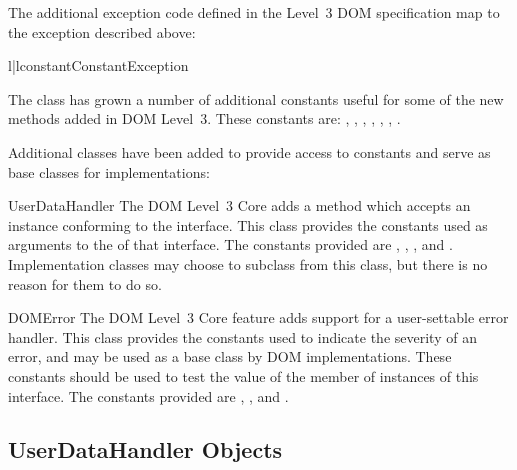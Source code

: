 \documentclass{howto}
\begin{document}
The additional exception code defined in the Level~3 DOM specification
map to the exception described above:

\begin{tableii}{l|l}{constant}{Constant}{Exception}
\end{tableii}

The  class has grown a number of additional constants
useful for some of the new methods added in DOM Level~3.  These
constants are:  ,
, ,
,
,
,
.

Additional classes have been added to provide access to constants and
serve as base classes for implementations:

\begin{classdesc*}{UserDataHandler}
  The DOM Level~3 Core adds a method
   which accepts an instance conforming to the
   interface.  This class provides the
  constants used as arguments to the  of that
  interface.  The constants provided are ,
  , , and
  .  Implementation classes may choose to
  subclass from this class, but there is no reason for them to do so.
\end{classdesc*}

\begin{classdesc*}{DOMError}
  The DOM Level~3 Core feature adds support for a user-settable
  error handler.  This class provides the constants used to indicate
  the severity of an error, and may be used as a base class by DOM
  implementations.  These constants should be used to test the value
  of the  member of instances of this interface.  The
  constants provided are ,
  , and .
\end{classdesc*}


\subsection{UserDataHandler Objects \label{userdatahandler}}
\end{document}
